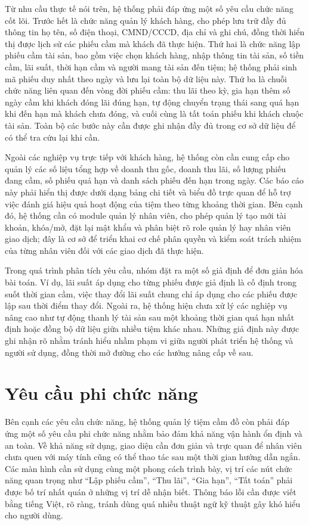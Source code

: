 \documentclass[13pt,a4paper]{extreport}
\begin{document}
Từ nhu cầu thực tế nói trên, hệ thống phải đáp ứng một số yêu cầu chức năng cốt lõi. Trước hết là chức năng quản lý khách hàng, cho phép lưu trữ đầy đủ thông tin họ tên, số điện thoại, CMND/CCCD, địa chỉ và ghi chú, đồng thời hiển thị được lịch sử các phiếu cầm mà khách đã thực hiện. Thứ hai là chức năng lập phiếu cầm tài sản, bao gồm việc chọn khách hàng, nhập thông tin tài sản, số tiền cầm, lãi suất, thời hạn cầm và người mang tài sản đến tiệm; hệ thống phải sinh mã phiếu duy nhất theo ngày và lưu lại toàn bộ dữ liệu này. Thứ ba là chuỗi chức năng liên quan đến vòng đời phiếu cầm: thu lãi theo kỳ, gia hạn thêm số ngày cầm khi khách đóng lãi đúng hạn, tự động chuyển trạng thái sang quá hạn khi đến hạn mà khách chưa đóng, và cuối cùng là tất toán phiếu khi khách chuộc tài sản. Toàn bộ các bước này cần được ghi nhận đầy đủ trong cơ sở dữ liệu để có thể tra cứu lại khi cần.

Ngoài các nghiệp vụ trực tiếp với khách hàng, hệ thống còn cần cung cấp cho quản lý các số liệu tổng hợp về doanh thu gốc, doanh thu lãi, số lượng phiếu đang cầm, số phiếu quá hạn và danh sách phiếu đến hạn trong ngày. Các báo cáo này phải hiển thị được dưới dạng bảng chi tiết và biểu đồ trực quan để hỗ trợ việc đánh giá hiệu quả hoạt động của tiệm theo từng khoảng thời gian. Bên cạnh đó, hệ thống cần có module quản lý nhân viên, cho phép quản lý tạo mới tài khoản, khóa/mở, đặt lại mật khẩu và phân biệt rõ role quản lý hay nhân viên giao dịch; đây là cơ sở để triển khai cơ chế phân quyền và kiểm soát trách nhiệm của từng nhân viên đối với các giao dịch đã thực hiện.

Trong quá trình phân tích yêu cầu, nhóm đặt ra một số giả định để đơn giản hóa bài toán. Ví dụ, lãi suất áp dụng cho từng phiếu được giả định là cố định trong suốt thời gian cầm, việc thay đổi lãi suất chung chỉ áp dụng cho các phiếu được lập sau thời điểm thay đổi. Ngoài ra, hệ thống hiện chưa xử lý các nghiệp vụ nâng cao như tự động thanh lý tài sản sau một khoảng thời gian quá hạn nhất định hoặc đồng bộ dữ liệu giữa nhiều tiệm khác nhau. Những giả định này được ghi nhận rõ nhằm tránh hiểu nhầm phạm vi giữa người phát triển hệ thống và người sử dụng, đồng thời mở đường cho các hướng nâng cấp về sau.

\section{Yêu cầu phi chức năng}

Bên cạnh các yêu cầu chức năng, hệ thống quản lý tiệm cầm đồ còn phải đáp ứng một số yêu cầu phi chức năng nhằm bảo đảm khả năng vận hành ổn định và an toàn. Về khả năng sử dụng, giao diện cần đơn giản và trực quan để nhân viên chưa quen với máy tính cũng có thể thao tác sau một thời gian hướng dẫn ngắn. Các màn hình cần sử dụng cùng một phong cách trình bày, vị trí các nút chức năng quan trọng như ``Lập phiếu cầm'', ``Thu lãi'', ``Gia hạn'', ``Tất toán'' phải được bố trí nhất quán ở những vị trí dễ nhận biết. Thông báo lỗi cần được viết bằng tiếng Việt, rõ ràng, tránh dùng quá nhiều thuật ngữ kỹ thuật gây khó hiểu cho người dùng.
\end{document}
